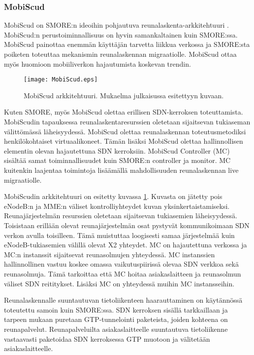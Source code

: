 \subsubsection{MobiScud} \label{mobiscud}
MobiScud on SMORE:n ideoihin pohjautuva reunalaskenta-arkkitehtuuri \cite{wang2015mobiscud}.
MobiScud:n perustoiminnallisuus on hyvin samankaltainen kuin SMORE:ssa. MobiScud painottaa enemmän käyttäjän tarvetta liikkua verkossa ja SMORE:sta poiketen toteuttaa mekanismin reunalaskennan migraatiolle. 
MobiScud ottaa myös huomioon mobiiliverkon hajautumista koskevan trendin.

\begin{figure}[tb]
\texttt{[image: MobiScud.eps]}
\caption{MobiScud arkkitehtuuri. Mukaelma julkaisussa \cite{wang2015mobiscud}  esitettyyn kuvaan.} \label{fig:mobiscud}
\end{figure}

Kuten SMORE, myös MobiScud olettaa erillisen SDN-kerroksen toteuttamista. MobiScudin tapauksessa reunalaskentaresurssien oletetaan sijaitsevan tukiaseman välittömässä läheisyydessä. 
MobiScud olettaa reunalaskennan toteutusmetodiksi henkilökohtaiset virtuaalikoneet.
Tämän lisäksi MobiScud olettaa hallinnollisen elementin olevan hajautettuna SDN kerroksiin. MobiScud Controller (MC) sisältää samat toiminnallisuudet kuin SMORE:n controller ja monitor. 
MC kuitenkin laajentaa toimintoja lisäämällä mahdollisuuden reunalaskennan live migraatiolle.

MobiScudin arkkitehtuuri on esitetty kuvassa \ref{fig:mobiscud}. Kuvasta on jätetty pois eNodeB:n ja MME:n väliset kontrolliyhteydet kuvan yksinkertaistamiseksi.
Reunajärjestelmän resurssien oletetaan sijaitsevan tukiasemien läheisyydessä.
Toisistaan erillään olevat reunajärjestelmän osat pystyvät kommunikoimaan SDN verkon avulla toisilleen.
Tämä muistuttaa loogisesti samaa järjestelmää kuin eNodeB-tukiasemien välillä olevat X2 yhteydet.
MC on hajautettuna verkossa ja MC:n instanssit sijaitsevat reunasolmujen yhteydessä.
MC instanssien hallinnollinen vastuu koskee omassa vaikutuspiirissä olevaa SDN verkkoa sekä reunasolmuja. Tämä tarkoittaa että MC hoitaa asiakaslaitteen ja reunasolmun väliset SDN reititykset. Lisäksi MC on yhteydessä muihin MC instansseihin.

Reunalaskennalle suuntautuvan tietoliikenteen haarauttaminen on käytännössä toteutettu samoin kuin SMORE:ssa.
SDN kerroksen sisällä tarkkaillaan ja tarpeen mukaan puretaan GTP-tunnelointi paketeista, joiden kohteena on reunapalvelut. Reunapalveluilta asiakaslaitteelle suuntautuva tietoliikenne vastaavasti paketoidaa SDN kerroksessa GTP muotoon ja välitetään asiakaslaitteelle.

